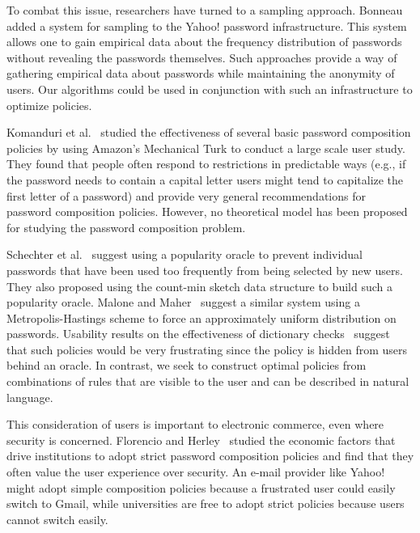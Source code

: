 \documentclass[prodmode,acmec]{ec-acmsmall}
\begin{document}
To combat this issue, researchers have turned to a sampling approach. Bonneau~\citeyear{bonneau2012science} added a system for sampling to the Yahoo! password infrastructure. This system allows one to gain empirical data about the frequency distribution of passwords without revealing the passwords themselves. Such approaches provide a way of gathering empirical data about passwords while maintaining the anonymity of users. Our algorithms could be used in conjunction with such an infrastructure to optimize policies.

Komanduri et al.~\citeyear{komanduri2011passwords} studied the effectiveness of several basic password composition policies by using Amazon's Mechanical Turk to conduct a large scale user study. They found that people often respond to restrictions in predictable ways (e.g., if the password needs to contain a capital letter users might tend to capitalize the first letter of a password) and provide very general recommendations for password composition policies. However, no theoretical model has been proposed for studying the password composition problem.

Schechter et al.~\citeyear{schechter2010popularity} suggest using a popularity oracle to prevent individual passwords that have been used too frequently from being selected by new users. They also proposed using the count-min sketch data structure \cite{cormode2005improved} to build such a popularity oracle. Malone and Maher~\citeyear{malone2012investigating} suggest a similar system using a Metropolis-Hastings scheme to force an approximately uniform distribution on passwords. Usability results on the effectiveness of dictionary checks~\cite{komanduri2011passwords} suggest that such policies would be very frustrating since the policy is hidden from users behind an oracle. In contrast, we seek to construct optimal policies from combinations of rules that are visible to the user and can be described in natural language. 

This consideration of users is important to electronic commerce, even where security is concerned. Florencio and Herley~\citeyear{florencio2010security} studied the economic factors that drive institutions to adopt strict password composition policies and find that they often value the user experience over security. An e-mail provider like Yahoo! might adopt simple composition policies because a frustrated user could easily switch to Gmail, while universities are free to adopt strict policies because users cannot switch easily.
\end{document}
